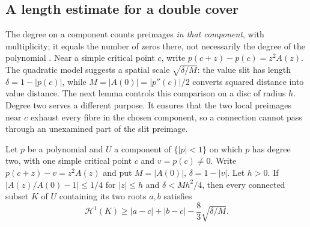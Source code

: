 \documentclass[11pt]{article}
\begin{document}
\subsection{A length estimate for a double cover}
The degree on a component counts preimages \emph{in that component},
with multiplicity; it equals the number of zeros there, not necessarily
the degree of the polynomial \cite[proof of Proposition~2.1]{eks2010}.
Near a simple critical point $c$, write $p(c+z)-p(c)=z^2A(z)$.
The quadratic model suggests a spatial scale $\sqrt{\delta/M}$:
the value slit has length $\delta=1-|p(c)|$, while
$M=|A(0)|=|p''(c)|/2$ converts squared distance into value distance.
The next lemma controls this comparison on a disc of radius $h$.
Degree two serves a different purpose. It ensures that the two local
preimages near $c$ exhaust every fibre in the chosen component, so a
connection cannot pass through an unexamined part of the slit preimage.

\begin{lemma}\label{lem:two-sheet-bottleneck}
Let $p$ be a polynomial and $U$ a component of $\{|p|<1\}$ on which $p$
has degree two, with one simple critical point $c$ and $v=p(c)\ne0$. Write
$p(c+z)-v=z^2A(z)$ and put $M=|A(0)|$, $\delta=1-|v|$.
Let $h>0$. If $|A(z)/A(0)-1|\le1/4$ for $|z|\le h$ and
$\delta<Mh^2/4$, then every connected subset $K$ of $U$ containing its
two roots $a,b$ satisfies
\[
 \mathcal H^1(K)\ge |a-c|+|b-c|-\frac83\sqrt{\delta/M}.
\]
\end{lemma}
\end{document}
